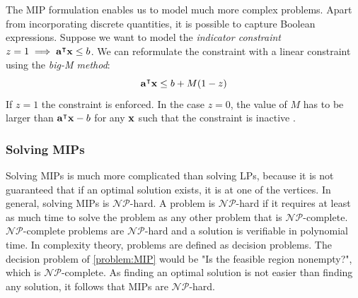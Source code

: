 The MIP formulation enables us to model much more complex problems. Apart from incorporating discrete quantities, it is possible to capture Boolean expressions. Suppose we want to model the \textit{indicator constraint} $z = 1 \implies \bold a^\intercal \bold x \leq b$. We can reformulate the constraint with a linear constraint using the \textit{big-M method}: 
\begin{equation*}
    \bold a^\intercal \bold x \leq b + M(1-z)
\end{equation*}
If $z=1$ the constraint is enforced. In the case $z=0$, the value of $M$ has to be larger than $\bold a^\intercal \bold x - b$ for any $\bold x$ such that the constraint is inactive \cite{aps_mosek_nodate}.

\subsubsection*{Solving MIPs} 
Solving MIPs is much more complicated than solving LPs, because it is not guaranteed that if an optimal solution exists, it is at one of the vertices. In general, solving MIPs is $\mathcal{NP}$-hard. A problem is $\mathcal{NP}$-hard if it requires at least as much time to solve the problem as any other problem that is $\mathcal{NP}$-complete. $\mathcal{NP}$-complete problems are $\mathcal{NP}$-hard and a solution is verifiable in polynomial time. In complexity theory, problems are defined as decision problems.\cite{CormenIntroduction} 
The decision problem of \cref{problem:MIP} would be "Is the feasible region nonempty?", which is $\mathcal{NP}$-complete. As finding an optimal solution is not easier than finding any solution, it follows that MIPs are $\mathcal{NP}$-hard. \cite{integer_programming}

